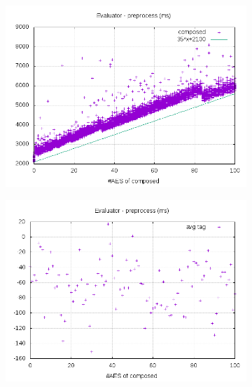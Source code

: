 \documentclass[10pt,a4paper]{article}
\begin{document}
\begin{figure}[h]
    \begin{subfigure}[t]{0.3\textwidth}
        \includegraphics[width=\textwidth]{eval_preprocess_plots}
        \caption{}
    \end{subfigure}
    \begin{subfigure}[t]{0.3\textwidth}
        \includegraphics[width=\textwidth]{eval_preprocess_avg}
        \caption{}
    \end{subfigure}
    \begin{subfigure}[t]{0.3\textwidth}

\end{subfigure}
\end{figure}
\end{document}
